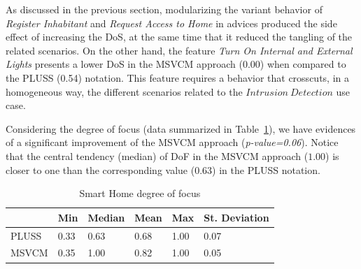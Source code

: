 As discussed in the previous section, modularizing the variant behavior of
\emph{Register Inhabitant} and \emph{Request Access to Home} in advices produced the side effect of increasing the DoS, at the same time that it reduced
the tangling of the related scenarios. On the other hand, the feature \emph{Turn
On Internal and External Lights} presents a lower DoS in the MSVCM approach
(0.00) when compared to the PLUSS (0.54) notation. This feature requires a
behavior that crosscuts, in a homogeneous way, the different scenarios related to
the $Intrusion\ Detection$ use case.


Considering the degree of focus (data summarized in Table~\ref{tab:sh-dof}), we
have evidences of a significant improvement of the MSVCM approach
(\emph{p-value=0.06}). Notice that the central tendency (median) of DoF in the
MSVCM approach ($1.00$) is closer to one than the corresponding value
($0.63$) in the PLUSS notation.

\begin{table}[htb] \centering
\caption{Smart Home degree of focus}
\label{tab:sh-dof}
\begin{small}
\begin{tabular}{llllll} \hline
					& Min 	& Median 	& Mean 	& Max 	& St. Deviation \\ \hline 
	PLUSS			& 0.33  & 0.63   	& 0.68  & 1.00 	& 0.07 			\\
	MSVCM			& 0.35  & 1.00   	& 0.82 	& 1.00 	& 0.05			\\ \hline	
\end{tabular}
\end{small}
\end{table}




